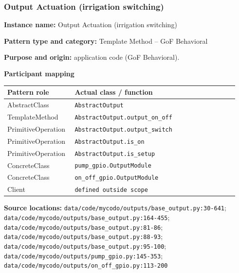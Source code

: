 \documentclass[11pt,a4paper]{article}
\newcommand{\field}[2]{\textbf{#1:} #2\par}
\begin{document}
\subsubsection{Output Actuation (irrigation switching)}
\field{Instance name}{Output Actuation (irrigation switching)}
\field{Pattern type and category}{Template Method -- GoF Behavioral}
\field{Purpose and origin}{application code (GoF Behavioral).}
\textbf{Participant mapping}\par
{\small\setlength{\tabcolsep}{3pt}
\begin{longtable}{@{}P{0.29\linewidth}P{0.68\linewidth}@{}}\toprule
\textbf{Pattern role} & \textbf{Actual class / function} \\ \midrule\endhead
AbstractClass & \texttt{AbstractOutput} \\
TemplateMethod & \texttt{AbstractOutput.\allowbreak{}output\_\allowbreak{}on\_\allowbreak{}off} \\
PrimitiveOperation & \texttt{AbstractOutput.\allowbreak{}output\_\allowbreak{}switch} \\
PrimitiveOperation & \texttt{AbstractOutput.\allowbreak{}is\_\allowbreak{}on} \\
PrimitiveOperation & \texttt{AbstractOutput.\allowbreak{}is\_\allowbreak{}setup} \\
ConcreteClass & \texttt{pump\_\allowbreak{}gpio.\allowbreak{}OutputModule} \\
ConcreteClass & \texttt{on\_\allowbreak{}off\_\allowbreak{}gpio.\allowbreak{}OutputModule} \\
Client & \texttt{defined outside scope} \\
\bottomrule\end{longtable}}
\textbf{Source locations:} \texttt{data/\allowbreak{}code/\allowbreak{}mycodo/\allowbreak{}outputs/\allowbreak{}base\_\allowbreak{}output.\allowbreak{}py:30-641}; \texttt{data/\allowbreak{}code/\allowbreak{}mycodo/\allowbreak{}outputs/\allowbreak{}base\_\allowbreak{}output.\allowbreak{}py:164-455}; \texttt{data/\allowbreak{}code/\allowbreak{}mycodo/\allowbreak{}outputs/\allowbreak{}base\_\allowbreak{}output.\allowbreak{}py:81-86}; \texttt{data/\allowbreak{}code/\allowbreak{}mycodo/\allowbreak{}outputs/\allowbreak{}base\_\allowbreak{}output.\allowbreak{}py:88-93}; \texttt{data/\allowbreak{}code/\allowbreak{}mycodo/\allowbreak{}outputs/\allowbreak{}base\_\allowbreak{}output.\allowbreak{}py:95-100}; \texttt{data/\allowbreak{}code/\allowbreak{}mycodo/\allowbreak{}outputs/\allowbreak{}pump\_\allowbreak{}gpio.\allowbreak{}py:145-353}; \texttt{data/\allowbreak{}code/\allowbreak{}mycodo/\allowbreak{}outputs/\allowbreak{}on\_\allowbreak{}off\_\allowbreak{}gpio.\allowbreak{}py:113-200}\par
\end{document}
